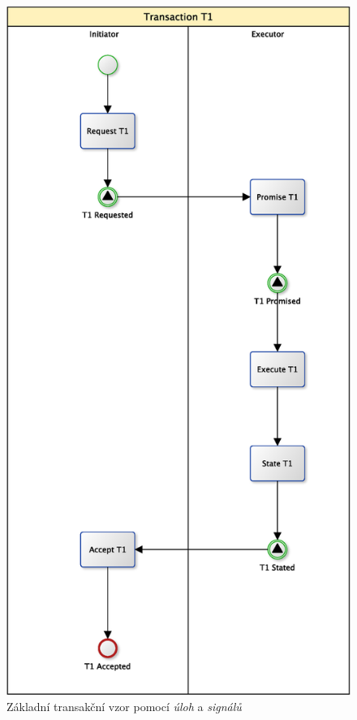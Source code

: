 \begin{figure}[htbp]
\centering
\includegraphics[width=\textwidth,height=\textheight,keepaspectratio]{obrazky/transaction-basic-signals}
\caption{Základní transakční vzor pomocí \textit{úloh} a \textit{signálů}}
\label{fig:Zk_trans_ulohy_signaly}
\end{figure}


